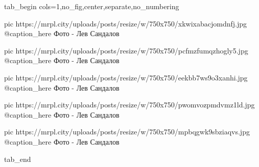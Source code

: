  
 
 
 
 

\ifcmt
  tab_begin cols=1,no_fig,center,separate,no_numbering

     pic https://mrpl.city/uploads/posts/resize/w/750x750/xkwixabacjomdnfj.jpg
		 @caption_here Фото - Лев Сандалов

		 pic https://mrpl.city/uploads/posts/resize/w/750x750/pcfmzfumqzhogly5.jpg
		 @caption_here Фото - Лев Сандалов

		 pic https://mrpl.city/uploads/posts/resize/w/750x750/eekbb7ws9o3xanhi.jpg
		 @caption_here Фото - Лев Сандалов

		 pic https://mrpl.city/uploads/posts/resize/w/750x750/pwomvozpmdvmz1ld.jpg
		 @caption_here Фото - Лев Сандалов

		 pic https://mrpl.city/uploads/posts/resize/w/750x750/mpbqgwk9sbziaqvs.jpg
		 @caption_here Фото - Лев Сандалов

  tab_end
\fi
